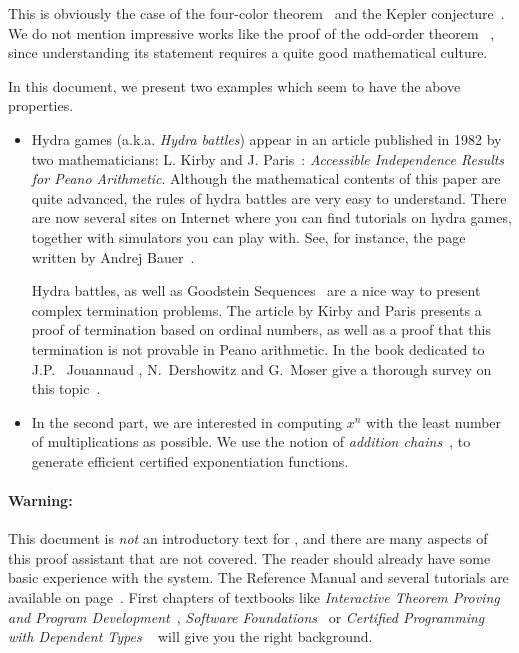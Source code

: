 \documentclass[a4paper]{book}
\begin{document}
This is obviously the case of the four-color theorem~\cite{fourcolors}  and the Kepler conjecture~\cite{flyspeck2015}. We do not mention impressive works like the proof of the odd-order theorem ~\cite{oddorderthm}, since understanding its statement requires a quite good mathematical culture.


In this document, we present two examples which seem to have the above properties.

\begin{itemize}
\item Hydra games (a.k.a. \emph{Hydra battles}) appear in an article published in 1982 by two mathematicians:
L. Kirby and J. Paris~\cite{KP82}: \emph{Accessible Independence Results for Peano Arithmetic}. 
Although the mathematical contents of this 
paper are quite advanced, the rules of hydra battles are very easy to understand. There are now several sites on Internet where you can find tutorials on hydra games, together with simulators you can play with. See, for instance, the page written by Andrej Bauer~\cite{bauer2008}.



Hydra battles, as well as Goodstein Sequences~\cite{goodstein_1944, KP82}
are a nice way to present complex termination problems.
The article by Kirby and Paris presents a proof of termination
based on ordinal numbers, as well as a proof that this termination is not
provable in Peano arithmetic. In the book dedicated to 
J.P. ~Jouannaud \cite{HommageJPJ}, N.~Dershowitz and G.~Moser  give a thorough survey on this topic~\cite{Dershowitz2007}.

\item In the second part, we are interested in computing $x^n$ with the least number of multiplications as possible. We use the notion of \emph{addition chains}~\cite{brauer1939,DBLP:journals/ipl/BerstelB87}, to generate efficient certified exponentiation functions.
\end{itemize}

\paragraph*{Warning:}

This document is \emph{not} an introductory text for \coq{}, and there are many aspects of this proof assistant that are not covered. 
 The reader should already have some basic experience with the \coq{} system. The Reference Manual and several tutorials are available on \coq{} page~\cite{Coq}.  First chapters of textbooks like \emph{Interactive Theorem Proving and Program Development}~\cite{BC04}, \emph{Software Foundations}~\cite{SF} or  \emph{Certified Programming with Dependent Types} ~\cite{chlipalacpdt2011} will give you the right background. 
\end{document}
